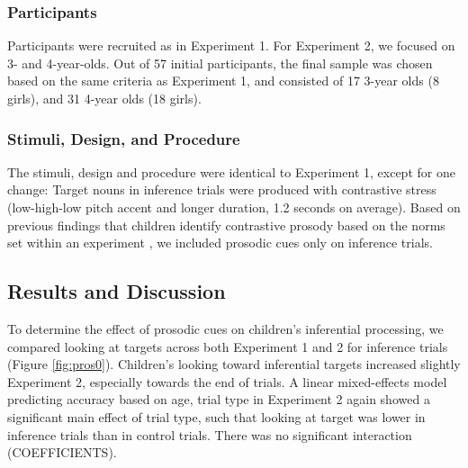 \documentclass[10pt,letterpaper]{article}
\begin{document}
\subsubsection{Participants}

Participants were recruited as in Experiment 1. For Experiment 2, we focused on 3- and 4-year-olds. Out of 57 initial participants, the final sample was chosen based on the same criteria as Experiment 1, and consisted of 17 3-year olds (8 girls), and 31 4-year olds (18 girls).

\subsubsection{Stimuli, Design, and Procedure}

The stimuli, design and procedure were identical to Experiment 1, except for one change: Target nouns in inference trials were produced with contrastive stress (low-high-low pitch accent and longer duration, 1.2 seconds on average). Based on previous findings that children identify contrastive prosody based on the norms set within an experiment \cite{kurumada2014}, we included prosodic cues only on inference trials. 

\subsection{Results and Discussion}

To determine the effect of prosodic cues on children's inferential processing, we compared looking at targets across both Experiment 1 and 2 for inference trials (Figure \ref{fig:pros0}). Children's looking toward inferential targets increased slightly Experiment 2, especially towards the end of trials. A linear mixed-effects model predicting accuracy based on age, trial type in Experiment 2 again showed a significant main effect of trial type, such that looking at target was lower in inference trials than in control trials. There was no significant interaction (COEFFICIENTS).
\end{document}
